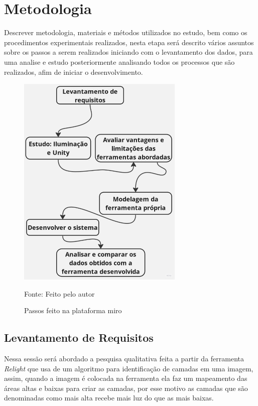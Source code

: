 \chapter{Metodologia}
\label{cap:03}

Descrever metodologia, materiais e métodos utilizados no estudo, bem como os procedimentos experimentais realizados, nesta etapa será descrito vários assuntos sobre os passos a serem realizados iniciando com o levantamento dos dados, para uma analise e estudo posteriormente analisando todos os processos que são realizados, afim de iniciar o desenvolvimento.


\begin{figure}[ht]
    \caption{Passos feito na plataforma miro}
    \centering
    \includegraphics{imagens/Diagrama.jpg}

    Fonte: Feito pelo autor
    \label{fig:diagrama}
\end{figure}

\section{Levantamento de Requisitos}

Nessa sessão será abordado a pesquisa qualitativa feita a partir da ferramenta \textit{Relight} que usa de um algoritmo para identificação de camadas em uma imagem, assim, quando a imagem é colocada na ferramenta ela faz um mapeamento das áreas altas e baixas para criar as camadas, por esse motivo as camadas que são denominadas como mais alta recebe mais luz do que as mais baixas.

